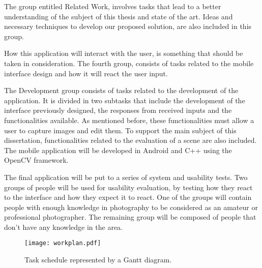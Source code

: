 The group entitled Related Work, involves tasks that lead to a better understanding of the subject of this thesis and state of the art. Ideas and necessary techniques to develop our proposed solution, are also included in this group.

How this application will interact with the user, is something that should be taken in consideration. The fourth group, consists of tasks related to the mobile interface design and how it will react the user input.

The Development group consists of tasks related to the development of the application. It is divided in two subtasks that include the development of the interface previously designed, the responses from received inputs and the functionalities available. As mentioned before, these functionalities must allow a user to capture images and edit them. To support the main subject of this dissertation, functionalities related to the evaluation of a scene are also included. The mobile application will be developed in Android and C++ using the OpenCV \cite{OCV} framework. 

The final application will be put to a series of system and usability tests. Two groups of people will be used for usability evaluation, by testing how they react to the interface and how they expect it to react. One of the groups will contain people with enough knowledge in photography to be considered as an amateur or professional photographer. The remaining group will be composed of people that don’t have any knowledge in the area.
\begin{figure}[htbp]
    \centering
    \texttt{[image: workplan.pdf]}
	\caption{Task schedule represented by a Gantt diagram.}
	\label{fig:workplan_diagram}
\end{figure}